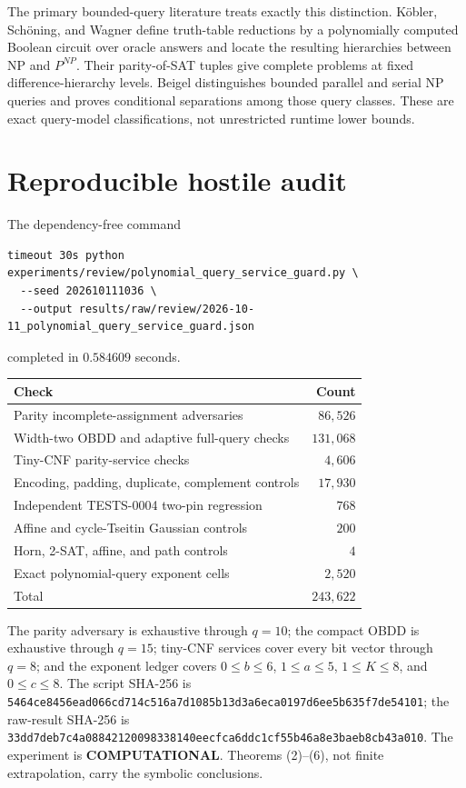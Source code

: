\documentclass[11pt]{article}
\newcommand{\COMP}{\textbf{COMPUTATIONAL}}
\begin{document}
The primary bounded-query literature treats exactly this distinction.
K\"obler, Sch\"oning, and Wagner define truth-table reductions by a polynomially
computed Boolean circuit over oracle answers and locate the resulting
hierarchies between NP and $P^{NP}$.  Their parity-of-SAT tuples give complete
problems at fixed difference-hierarchy levels.  Beigel distinguishes bounded
parallel and serial NP queries and proves conditional separations among those
query classes.  These are exact query-model classifications, not unrestricted
runtime lower bounds.

\section{Reproducible hostile audit}

The dependency-free command
\begin{verbatim}
timeout 30s python experiments/review/polynomial_query_service_guard.py \
  --seed 202610111036 \
  --output results/raw/review/2026-10-11_polynomial_query_service_guard.json
\end{verbatim}
completed in $0.584609$ seconds.

\begin{center}
\begin{tabular}{lr}
\toprule
Check & Count\\
\midrule
Parity incomplete-assignment adversaries & $86{,}526$\\
Width-two OBDD and adaptive full-query checks & $131{,}068$\\
Tiny-CNF parity-service checks & $4{,}606$\\
Encoding, padding, duplicate, complement controls & $17{,}930$\\
Independent TESTS-0004 two-pin regression & $768$\\
Affine and cycle-Tseitin Gaussian controls & $200$\\
Horn, 2-SAT, affine, and path controls & $4$\\
Exact polynomial-query exponent cells & $2{,}520$\\
\midrule
Total & $243{,}622$\\
\bottomrule
\end{tabular}
\end{center}

The parity adversary is exhaustive through $q=10$; the compact OBDD is
exhaustive through $q=15$; tiny-CNF services cover every bit vector through
$q=8$; and the exponent ledger covers $0\le b\le6$, $1\le a\le5$,
$1\le K\le8$, and $0\le c\le8$.  The script SHA-256 is
\nolinkurl{5464ce8456ead066cd714c516a7d1085b13d3a6eca0197d6ee5b635f7de54101};
the raw-result SHA-256 is
\nolinkurl{33dd7deb7c4a08842120098338140eecfca6ddc1cf55b46a8e3baeb8cb43a010}.
The experiment is \COMP.  Theorems (2)--(6), not finite extrapolation, carry
the symbolic conclusions.
\end{document}
